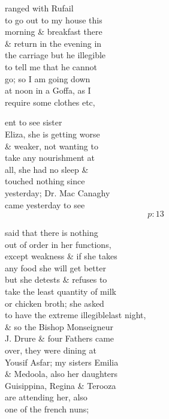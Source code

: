 \documentclass{report}
\begin{document}
	\par{
 	ranged with Rufail\ \\to go out to my house this\ \\morning \& breakfast there\ \\\& return in the evening in\ \\the carriage but he \lbrack illegible\rbrack\ \\to tell me that he cannot\ \\go; so I am going down\ \\at noon in a Goffa, as I\ \\require some clothes etc,\ \\
	}

	\par{
 	ent to see sister\ \\Eliza, she is getting worse\ \\\& weaker, not wanting to\ \\take any nourishment at\ \\all, she had no sleep \&\ \\touched nothing since\ \\yesterday; Dr. Mac Canaghy\ \\came yesterday to see\ \\
  \[p: 13 \]

	}



	\par{
 	said that there is nothing\ \\out of order in her functions,\ \\except weakness \& if she takes\ \\any food she will get better\ \\but she detests \& refuses to\ \\take the least quantity of milk\ \\or chicken broth; she asked\ \\to have the extreme \lbrack illegible\rbrack last night,\ \\\& so the Bishop Monseigneur\ \\J. Drure \& four Fathers came\ \\over, they were dining at\ \\Yousif Asfar; my sisters Emilia\ \\\& Medoola, also her daughters\ \\Guisippina, Regina \& Terooza\ \\are attending her, also\ \\one of the french nuns;\ \\
	}
\end{document}

